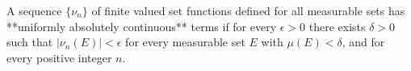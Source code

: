 A sequence $\{\nu_n\}$ of finite valued set functions defined for all measurable sets has **uniformly absolutely continuous** terms if for every $\epsilon > 0$ there exists $\delta > 0$ such that $|\nu_n(E)| < \epsilon$ for every measurable set $E$ with $\mu(E) < \delta$, and for every positive integer $n$.
